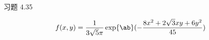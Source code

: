 \begin{problem}
    习题 4.35
    \begin{solution}
        $$
        f(x, y) = \frac{1}{3 \sqrt{5} \pi} \exp\ab(- \frac{8 x^2 + 2 \sqrt{3} x y + 6 y^2}{45})
        $$
    \end{solution}
\end{problem}